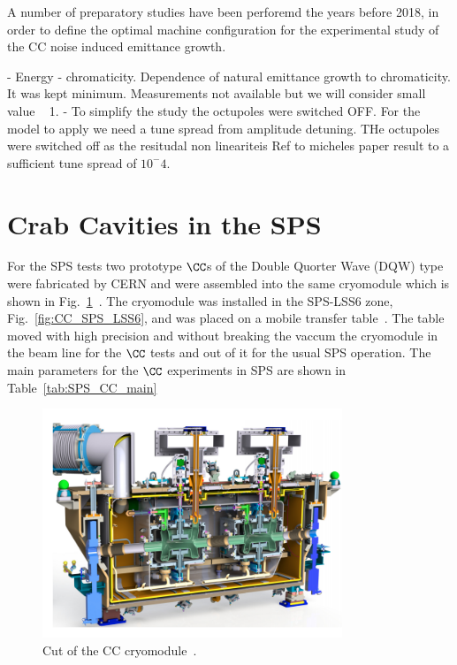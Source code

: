 A number of preparatory studies have been perforemd the years before 2018, in order to define the optimal machine configuration for the experimental study of the CC noise induced emittance growth.

- Energy
- chromaticity. Dependence of natural emittance growth to chromaticity. It was kept minimum. Measurements not available but we will consider small value ~ 1.
- To simplify the study the octupoles were switched OFF. For the model to apply we need a tune spread from amplitude detuning. THe octupoles were switched off as the resitudal non lineariteis Ref to micheles paper result to a sufficient tune spread of $10^-4$.

\section{Crab Cavities in the SPS}\label{sec:CC_SPS_setup}

For the SPS tests two prototype $\CC$s of the Double Quorter Wave (DQW) type were fabricated by CERN and were assembled into the same cryomodule which is shown in Fig.~\ref{fig:DQW_cryomodule}~\cite{Zanoni:2017}. The cryomodule was installed in the SPS-LSS6 zone, Fig.~\ref{fig:CC_SPS_LSS6}, and was placed on a mobile transfer table~\cite{Calaga:2649807}. The table moved with high precision and without breaking the vaccum the cryomodule in the beam line for the $\CC$ tests and out of it for the usual SPS operation. The main parameters for the $\CC$ experiments in SPS are shown in Table~\ref{tab:SPS_CC_main}


\begin{figure}[h]
   \centering         
   \includegraphics[width=0.8\textwidth]{images/Ch4/CC_cryomodule.png}
       \caption{Cut of the CC cryomodule~\cite{Zanoni:2017}.}
       \label{fig:DQW_cryomodule}
\end{figure}

